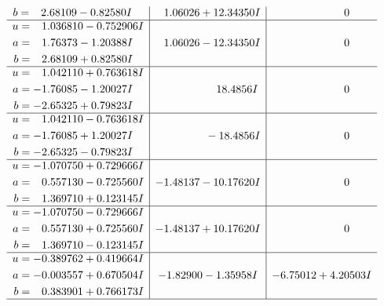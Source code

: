 \documentclass[1p]{elsarticle_modified}
\theoremstyle{definition}
\begin{document}
$$\begin{array}{c|c|c}
\begin{aligned}
b &= \phantom{-}2.68109 - 0.82580 I\end{aligned}
 & \phantom{-}1.06026 + 12.34350 I & \phantom{-0.000000 } 0 \\ \hline\begin{aligned}
u &= \phantom{-}1.036810 - 0.752906 I \\
a &= \phantom{-}1.76373 - 1.20388 I \\
b &= \phantom{-}2.68109 + 0.82580 I\end{aligned}
 & \phantom{-}1.06026 - 12.34350 I & \phantom{-0.000000 } 0 \\ \hline\begin{aligned}
u &= \phantom{-}1.042110 + 0.763618 I \\
a &= -1.76085 - 1.20027 I \\
b &= -2.65325 + 0.79823 I\end{aligned}
 & \phantom{-0.000000 -}18.4856 I & \phantom{-0.000000 } 0 \\ \hline\begin{aligned}
u &= \phantom{-}1.042110 - 0.763618 I \\
a &= -1.76085 + 1.20027 I \\
b &= -2.65325 - 0.79823 I\end{aligned}
 & \phantom{-0.000000 } -18.4856 I & \phantom{-0.000000 } 0 \\ \hline\begin{aligned}
u &= -1.070750 + 0.729666 I \\
a &= \phantom{-}0.557130 - 0.725560 I \\
b &= \phantom{-}1.369710 + 0.123145 I\end{aligned}
 & -1.48137 - 10.17620 I & \phantom{-0.000000 } 0 \\ \hline\begin{aligned}
u &= -1.070750 - 0.729666 I \\
a &= \phantom{-}0.557130 + 0.725560 I \\
b &= \phantom{-}1.369710 - 0.123145 I\end{aligned}
 & -1.48137 + 10.17620 I & \phantom{-0.000000 } 0 \\ \hline\begin{aligned}
u &= -0.389762 + 0.419664 I \\
a &= -0.003557 + 0.670504 I \\
b &= \phantom{-}0.383901 + 0.766173 I\end{aligned}
 & -1.82900 - 1.35958 I & -6.75012 + 4.20503 I\\
 \hline 
 \end{array}$$\newpage$$\begin{array}{c|c|c}  

\end{array}$$
\end{document}
